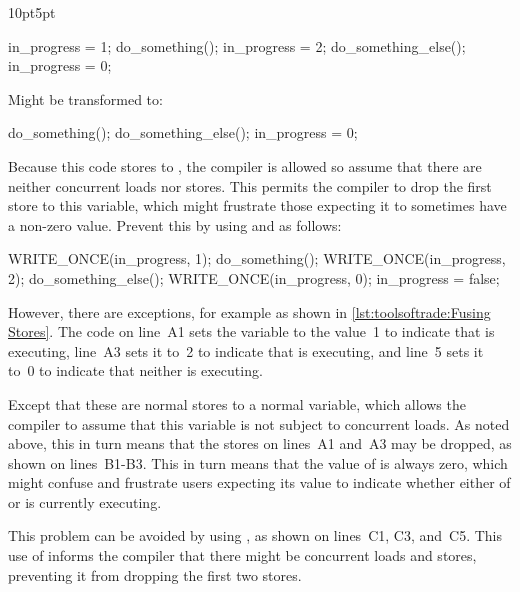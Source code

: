 \begin{description}[labelsep=.4em]
\begin{listing}[tb]
\begin{adjustwidth}{10pt}{5pt}
\footnotesize
\renewcommand{\myfvline}{A\arabic{FancyVerbLine}}
\begin{VerbatimT}
in_progress = 1;
do_something();
in_progress = 2;
do_something_else();
in_progress = 0;
\end{VerbatimT}
Might be transformed to:
\renewcommand{\myfvline}{B\arabic{FancyVerbLine}}
\begin{VerbatimT}
do_something();
do_something_else();
in_progress = 0;
\end{VerbatimT}
Because this code stores to , the compiler is
allowed so assume that there are neither concurrent loads nor
stores.
This permits the compiler to drop the first store to this variable, which
might frustrate those expecting it to sometimes have a non-zero value.
Prevent this by using  and  as follows:
\renewcommand{\myfvline}{C\arabic{FancyVerbLine}}
\begin{VerbatimT}
WRITE_ONCE(in_progress, 1);
do_something();
WRITE_ONCE(in_progress, 2);
do_something_else();
WRITE_ONCE(in_progress, 0);
in_progress = false;
\end{VerbatimT}
\end{adjustwidth}
\caption{Fusing Stores}
\label{lst:toolsoftrade:Fusing Stores}
\end{listing}

However, there are exceptions, for example as shown in
\cref{lst:toolsoftrade:Fusing Stores}.
The code on line~A1 sets the variable  to the value~1
to indicate that  is executing, line~A3 sets it to~2
to indicate that  is executing, and line~5 sets
it to~0 to indicate that neither is executing.

Except that these are normal stores to a normal variable, which allows the
compiler to assume that this variable is not subject to concurrent loads.
As noted above, this in turn means that the stores on lines~A1 and~A3
may be dropped, as shown on lines~B1-B3.
This in turn means that the value of  is always zero,
which might confuse and frustrate users expecting its value to indicate
whether either of  or  is
currently executing.

This problem can  be avoided by using , as shown
on lines~C1, C3, and~C5.
This use of  informs the compiler that there might
be concurrent loads and stores, preventing it from dropping the
first two stores.


\end{description}
